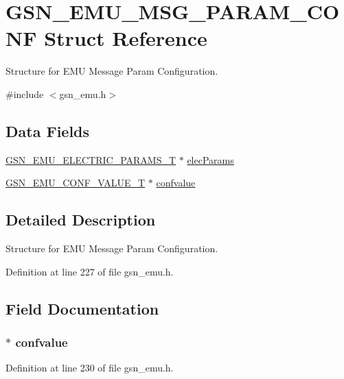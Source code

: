 \hypertarget{a00064}{
\section{GSN\_\-EMU\_\-MSG\_\-PARAM\_\-CONF Struct Reference}
\label{a00064}
}


Structure for EMU Message Param Configuration.  




{\ttfamily \#include $<$gsn\_\-emu.h$>$}

\subsection*{Data Fields}
\begin{DoxyCompactItemize}
\item 
\hyperlink{a00060}{GSN\_\-EMU\_\-ELECTRIC\_\-PARAMS\_\-T} $\ast$ \hyperlink{a00064_a76b36b28c0c66c5998cc5981154df9ed}{elecParams}
\item 
\hyperlink{a00058}{GSN\_\-EMU\_\-CONF\_\-VALUE\_\-T} $\ast$ \hyperlink{a00064_a2fc01b37fc7ed6777d21524796f8db43}{confvalue}
\end{DoxyCompactItemize}


\subsection{Detailed Description}
Structure for EMU Message Param Configuration. 

Definition at line 227 of file gsn\_\-emu.h.



\subsection{Field Documentation}
\hypertarget{a00064_a2fc01b37fc7ed6777d21524796f8db43}{
\subsubsection[{confvalue}]{$\ast$ {\bf confvalue}}}
\label{a00064_a2fc01b37fc7ed6777d21524796f8db43}


Definition at line 230 of file gsn\_\-emu.h.

